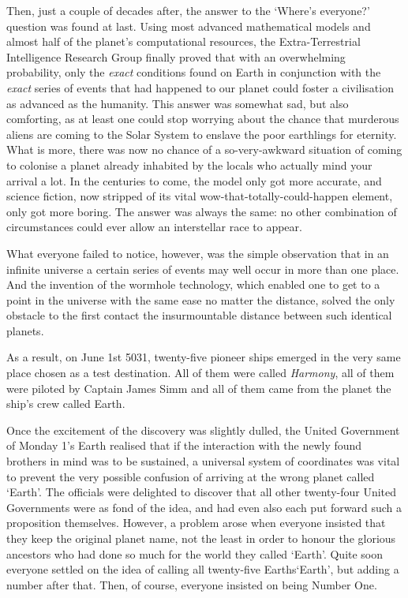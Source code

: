 Then, just a couple of decades after, the answer to the `Where's
everyone?'  question was found at last. Using most advanced
mathematical models and almost half of the planet's computational
resources, the Extra-Terrestrial Intelligence Research Group finally
proved that with an overwhelming probability, only the \emph{exact}
conditions found on Earth in conjunction with the \emph{exact} series
of events that had happened to our planet could foster a civilisation
as advanced as the humanity.  This answer was somewhat sad, but also
comforting, as at least one could stop worrying about the chance that
murderous aliens are coming to the Solar System to enslave the poor
earthlings for eternity. What is more, there was now no chance of a
so-very-awkward situation of coming to colonise a planet already
inhabited by the locals who actually mind your arrival a lot. In the
centuries to come, the model only got more accurate, and science
fiction, now stripped of its vital wow-that-totally-could-happen
element, only got more boring. The answer was always the same: no
other combination of circumstances could ever allow an interstellar
race to appear.

What everyone failed to notice, however, was the simple observation
that in an infinite universe a certain series of events may well occur
in more than one place. And the invention of the wormhole technology,
which enabled one to get to a point in the universe with the same ease
no matter the distance, solved the only obstacle to the first contact
\textemdash{} the insurmountable distance between such identical
planets.

As a result, on June 1st 5031, twenty-five pioneer ships emerged in
the very same place chosen as a test destination. All of them were
called \emph{Harmony}, all of them were piloted by Captain James Simm
and all of them came from the planet the ship's crew called Earth.

Once the excitement of the discovery was slightly dulled, the United
Government of Monday 1's Earth realised that if the interaction with
the newly found brothers in mind was to be sustained, a universal
system of coordinates was vital to prevent the very possible confusion
of arriving at the wrong planet called `Earth'. The officials were
delighted to discover that all other twenty-four United Governments
were as fond of the idea, and had even also each put forward such a
proposition themselves. However, a problem arose when everyone
insisted that they keep the original planet name, not the least in
order to honour the glorious ancestors who had done so much for the
world they called `Earth'. Quite soon everyone settled on the idea of
calling all twenty-five Earths\textellipsis `Earth', but adding a
number after that. Then, of course, everyone insisted on being Number
One.

